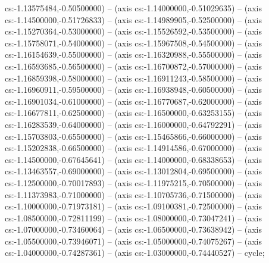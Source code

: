 cs:-1.13575484,-0.50500000) -- (axis cs:-1.14000000,-0.51029635) -- (axis cs:-1.14500000,-0.51726833) -- (axis cs:-1.14989905,-0.52500000) -- (axis cs:-1.15270364,-0.53000000) -- (axis cs:-1.15526592,-0.53500000) -- (axis cs:-1.15758071,-0.54000000) -- (axis cs:-1.15967508,-0.54500000) -- (axis cs:-1.16154639,-0.55000000) -- (axis cs:-1.16320988,-0.55500000) -- (axis cs:-1.16593685,-0.56500000) -- (axis cs:-1.16700872,-0.57000000) -- (axis cs:-1.16859398,-0.58000000) -- (axis cs:-1.16911243,-0.58500000) -- (axis cs:-1.16960911,-0.59500000) -- (axis cs:-1.16938948,-0.60500000) -- (axis cs:-1.16901034,-0.61000000) -- (axis cs:-1.16770687,-0.62000000) -- (axis cs:-1.16677811,-0.62500000) -- (axis cs:-1.16500000,-0.63253155) -- (axis cs:-1.16283539,-0.64000000) -- (axis cs:-1.16000000,-0.64792291) -- (axis cs:-1.15703803,-0.65500000) -- (axis cs:-1.15465866,-0.66000000) -- (axis cs:-1.15202838,-0.66500000) -- (axis cs:-1.14914586,-0.67000000) -- (axis cs:-1.14500000,-0.67645641) -- (axis cs:-1.14000000,-0.68338653) -- (axis cs:-1.13463557,-0.69000000) -- (axis cs:-1.13012804,-0.69500000) -- (axis cs:-1.12500000,-0.70017893) -- (axis cs:-1.11975215,-0.70500000) -- (axis cs:-1.11373983,-0.71000000) -- (axis cs:-1.10705736,-0.71500000) -- (axis cs:-1.10000000,-0.71973181) -- (axis cs:-1.09100381,-0.72500000) -- (axis cs:-1.08500000,-0.72811199) -- (axis cs:-1.08000000,-0.73047241) -- (axis cs:-1.07000000,-0.73460064) -- (axis cs:-1.06500000,-0.73638942) -- (axis cs:-1.05500000,-0.73946071) -- (axis cs:-1.05000000,-0.74075267) -- (axis cs:-1.04000000,-0.74287361) -- (axis cs:-1.03000000,-0.74440527) -- cycle;
